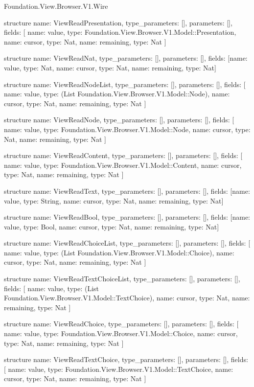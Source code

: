 \begin{lexlean}{Foundation.View.Browser.V1.Wire}
\begin{semanticmodule}
structure{
  name: ViewReadPresentation,
  type_parameters: [],
  parameters: [],
  fields: [
    {name: value, type: Foundation.View.Browser.V1.Model::Presentation},
    {name: cursor, type: Nat},
    {name: remaining, type: Nat}
  ]
}

structure{
  name: ViewReadNat,
  type_parameters: [],
  parameters: [],
  fields: [{name: value, type: Nat}, {name: cursor, type: Nat}, {name: remaining, type: Nat}]
}

structure{
  name: ViewReadNodeList,
  type_parameters: [],
  parameters: [],
  fields: [
    {name: value, type: (List Foundation.View.Browser.V1.Model::Node)},
    {name: cursor, type: Nat},
    {name: remaining, type: Nat}
  ]
}

structure{
  name: ViewReadNode,
  type_parameters: [],
  parameters: [],
  fields: [
    {name: value, type: Foundation.View.Browser.V1.Model::Node},
    {name: cursor, type: Nat},
    {name: remaining, type: Nat}
  ]
}

structure{
  name: ViewReadContent,
  type_parameters: [],
  parameters: [],
  fields: [
    {name: value, type: Foundation.View.Browser.V1.Model::Content},
    {name: cursor, type: Nat},
    {name: remaining, type: Nat}
  ]
}

structure{
  name: ViewReadText,
  type_parameters: [],
  parameters: [],
  fields: [{name: value, type: String}, {name: cursor, type: Nat}, {name: remaining, type: Nat}]
}

structure{
  name: ViewReadBool,
  type_parameters: [],
  parameters: [],
  fields: [{name: value, type: Bool}, {name: cursor, type: Nat}, {name: remaining, type: Nat}]
}

structure{
  name: ViewReadChoiceList,
  type_parameters: [],
  parameters: [],
  fields: [
    {name: value, type: (List Foundation.View.Browser.V1.Model::Choice)},
    {name: cursor, type: Nat},
    {name: remaining, type: Nat}
  ]
}

structure{
  name: ViewReadTextChoiceList,
  type_parameters: [],
  parameters: [],
  fields: [
    {name: value, type: (List Foundation.View.Browser.V1.Model::TextChoice)},
    {name: cursor, type: Nat},
    {name: remaining, type: Nat}
  ]
}

structure{
  name: ViewReadChoice,
  type_parameters: [],
  parameters: [],
  fields: [
    {name: value, type: Foundation.View.Browser.V1.Model::Choice},
    {name: cursor, type: Nat},
    {name: remaining, type: Nat}
  ]
}

structure{
  name: ViewReadTextChoice,
  type_parameters: [],
  parameters: [],
  fields: [
    {name: value, type: Foundation.View.Browser.V1.Model::TextChoice},
    {name: cursor, type: Nat},
    {name: remaining, type: Nat}
  ]
}


\end{semanticmodule}
\end{lexlean}
